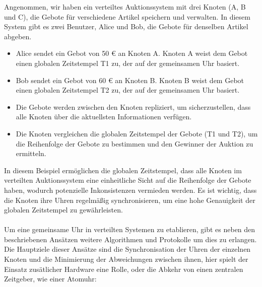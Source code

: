 \documentclass[../vs-script-first-v01.tex]{subfiles}
\begin{document}
Angenommen, wir haben ein verteiltes Auktionssystem mit drei Knoten (A, B und C), die Gebote für verschiedene Artikel speichern und verwalten. In diesem System gibt es zwei Benutzer, Alice und Bob, die Gebote für denselben Artikel abgeben.
\begin{itemize}
\item Alice sendet ein Gebot von 50 € an Knoten A. Knoten A weist dem Gebot einen globalen Zeitstempel T1 zu, der auf der gemeinsamen Uhr basiert.
\item Bob sendet ein Gebot von 60 € an Knoten B. Knoten B weist dem Gebot einen globalen Zeitstempel T2 zu, der auf der gemeinsamen Uhr basiert.
\item Die Gebote werden zwischen den Knoten repliziert, um sicherzustellen, dass alle Knoten über die aktuellsten Informationen verfügen.
\item Die Knoten vergleichen die globalen Zeitstempel der Gebote (T1 und T2), um die Reihenfolge der Gebote zu bestimmen und den Gewinner der Auktion zu ermitteln.
\end{itemize}
In diesem Beispiel ermöglichen die globalen Zeitstempel, dass alle Knoten im verteilten Auktionssystem eine einheitliche Sicht auf die Reihenfolge der Gebote haben, wodurch potenzielle Inkonsistenzen vermieden werden. Es ist wichtig, dass die Knoten ihre Uhren regelmäßig synchronisieren, um eine hohe Genauigkeit der globalen Zeitstempel zu gewährleisten.
\\\\
Um eine gemeinsame Uhr in verteilten Systemen zu etablieren, gibt es neben den beschriebenen Ansätzen weitere Algorithmen und Protokolle um dies zu erlangen. Die Hauptziele dieser Ansätze sind die Synchronisation der Uhren der einzelnen Knoten und die Minimierung der Abweichungen zwischen ihnen, hier spielt der Einsatz zusätlicher Hardware eine Rolle, oder die Abkehr von einen zentralen Zeitgeber, wie einer Atomuhr:
\end{document}
